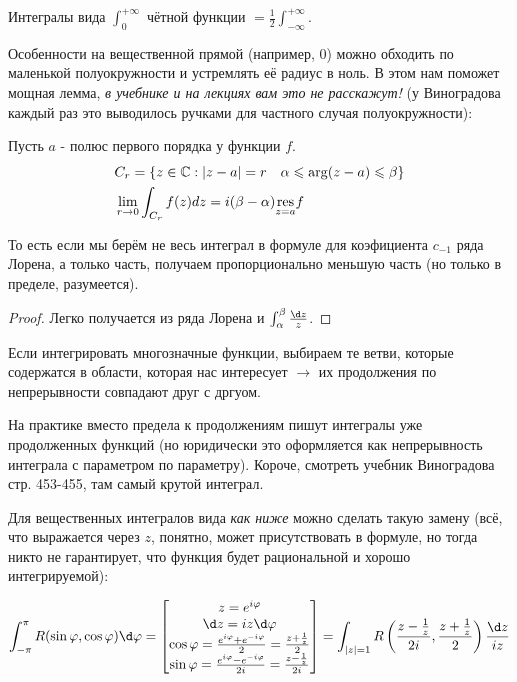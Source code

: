 \documentclass[12pt, a4paper]{article}
\begin{document}
Интегралы вида $\int_0^{+\infty}$ чётной функции $= \frac{1}{2} \int_{-\infty}^{+\infty}$.

Особенности на вещественной прямой (например, $0$) можно обходить по маленькой полуокружности и устремлять её радиус в ноль. 
В этом нам поможет мощная лемма, \textit{в учебнике и на лекциях вам это не расскажут!} 
(у Виноградова каждый раз это выводилось ручками для частного случая полуокружности):

\begin{theorem}

  Пусть $a$ - полюс первого порядка у функции $f$.
  \begin{equation}
    \begin{aligned}
      & C_r=\{z \in \mathbb{C}:|z-a|=r \quad \alpha \leqslant \arg (z-a) \leqslant \beta\} \\
      & \lim _{r \rightarrow 0} \int_{C_r} f(z) d z=i(\beta-\alpha) \underset{z=a}{\operatorname{res}} f
    \end{aligned}    
  \end{equation}
\end{theorem}

То есть если мы берём не весь интеграл в формуле для коэфициента $c_{-1}$ ряда Лорена, 
а только часть, получаем пропорционально меньшую часть (но только в пределе, разумеется).

\begin{proof}
  Легко получается из ряда Лорена и $\int_\alpha^\beta \frac{\d z}{z}$.
\end{proof}

Если интегрировать многозначные функции, выбираем те ветви, которые содержатся в области, 
которая нас интересует $→$ их продолжения по непрерывности совпадают друг с дргуом.

На практике вместо предела к продолжениям пишут интегралы уже продолженных функций
(но юридически это оформляется как непрерывность интеграла с параметром по параметру).
Короче, смотреть учебник Виноградова стр. 453-455, там самый крутой интеграл.

Для вещественных интегралов вида \textit{как ниже} можно сделать такую замену
(всё, что выражается через $z$, понятно, может присутствовать в формуле, но тогда никто не гарантирует, что функция будет рациональной и хорошо интегрируемой):

\begin{equation}
  \int_{-\pi}^{\pi} R(\sin \varphi, \cos \varphi) \d \varphi = \begin{bmatrix}
    z = e^{i \varphi} \\ \d z = i z \d \varphi \\
    \cos \varphi = \frac{e^{i \varphi} + e^{- i \varphi}}{2} = \frac{z + \frac{1}{z}}{2} \\
    \sin \varphi = \frac{e^{i \varphi} - e^{- i \varphi}}{2i} = \frac{z - \frac{1}{z}}{2i} \\
  \end{bmatrix} = \int_{|z| = 1} R\left(\frac{z - \frac{1}{z}}{2i}, \frac{z + \frac{1}{z}}{2}\right) \frac{\d z}{i z}
\end{equation}
\end{document}
